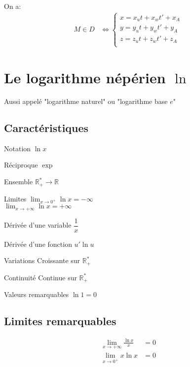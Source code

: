 \documentclass{article}
\newcommand{\R}{\mathds{R}}
\newcommand{\oo}{\infty}
\newenvironment{descriptiona}{\begin{description}[leftmargin=!,labelwidth=\widthof{\bfseries The longest label}]}{\end{description}}
\begin{document}
On a:
\begin{equation*}
    \begin{split}
        M \in D &\iff
        \begin{cases}
            x = x_ut + x_wt' + x_A \\
            y = y_ut + y_wt' + y_A \\
            z = z_ut + z_wt' + z_A \\
        \end{cases}
    \end{split}
\end{equation*}



\newpage
\section{Le logarithme népérien $\ln$}

Aussi appelé "logarithme naturel" ou "logarithme base $e$"

\subsection{Caractéristiques}
\begin{descriptiona}
\item[Notation] $\ln{x}$
\item[Réciproque] $\exp$
\item[Ensemble] $\R_+^\ast \to \R$
\item[Limites]
    $\displaystyle \lim_{x\to0^+} \ln{x} = -\oo$ \\
    $\displaystyle \lim_{x\to+\oo} \ln{x} = +\oo$
\item[Dérivée d'une variable] $\dfrac{1}{x}$
\item[Dérivée d'une fonction] $u'\ln u$
\item[Variations] Croissante sur $\R_+^\ast$
\item[Continuité] Continue sur $\R_+^\ast$
\item[Valeurs remarquables] $\ln{1} = 0$
\end{descriptiona}

\subsection{Limites remarquables}

\begin{equation*}
    \begin{split}
        \lim_{x\to+\oo} \frac{\ln x}{x} &= 0 \\
        \lim_{x\to0^+} x\ln x &= 0
    \end{split}
\end{equation*}
\end{document}
